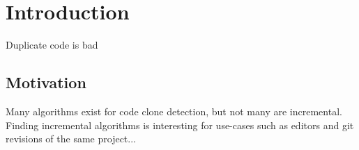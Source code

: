 \chapter{Introduction}

Duplicate code is bad

\section{Motivation}

Many algorithms exist for code clone detection, but not many are incremental. Finding
incremental algorithms is interesting for use-cases such as editors and git revisions of
the same project...
